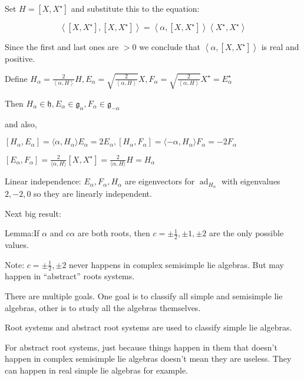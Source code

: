 \documentclass{article}
\theoremstyle{definition}
\begin{document}
Set \(H=[X,X^{\star} ]\) and substitute this to the equation:

\[
    \left\langle [X,X^{\star} ],[X,X^{\star} ] \right\rangle = \left\langle \alpha ,[X,X^{\star} ] \right\rangle \left\langle X^{\star} ,X^{\star}  \right\rangle 
\]

Since the first and last ones are \(>0\) we conclude that \(\left\langle \alpha ,[X,X^{\star} ] \right\rangle \) is real and positive.

Define \(H_\alpha =\frac{2}{\left\langle \alpha ,H \right\rangle }H,E_\alpha =\sqrt{\frac{2}{\left\langle \alpha ,H \right\rangle }}X, F_\alpha =\sqrt{\frac{2}{\left\langle \alpha ,H \right\rangle }} X^{\star} =E_\alpha ^{\star} \)

Then \(H_\alpha\in \mathfrak{h}, E_\alpha \in \mathfrak{g}_\alpha  , F_\alpha \in \mathfrak{g}_{-\alpha }  \) 

and also,

\([H_\alpha ,E_\alpha ]= \langle \alpha ,H_\alpha  \rangle E_\alpha =2E_{\alpha }, [H_\alpha ,F_\alpha] = \langle -\alpha ,H_\alpha  \rangle F_\alpha =-2F_\alpha  \) 

\([E_\alpha ,F_\alpha ]= \frac{2}{\langle \alpha ,H \rangle }[X,X^{\star} ]=\frac{2}{\langle \alpha ,H \rangle }H= H_\alpha \) 

Linear independence: \(E_\alpha ,F_\alpha ,H_\alpha \) are eigenvectors for \(\operatorname{ad}_{H_\alpha} \) with eigenvalues \(2,-2,0\) so they are linearly independent.

Next big result:

Lemma:If \(\alpha \) and \(c \alpha\) are both roots, then \(c=\pm \frac{1}{2}, \pm 1, \pm 2\) are the only possible values.

Note: \(c=\pm \frac{1}{2},\pm 2\) never happens in complex semisimple lie algebras. But may happen in ``abstract'' roots systems.

There are multiple goals. One goal is to classify all simple and semisimple lie algebras, other is to study all the algebras themselves.

Root systems and abstract root systems are used to classify simple lie algebras.

For abstract root systems, just because things happen in them that doesn't happen in complex semisimple lie algebras doesn't mean they are useless. They can happen in real simple lie algebras for example.
\end{document}
